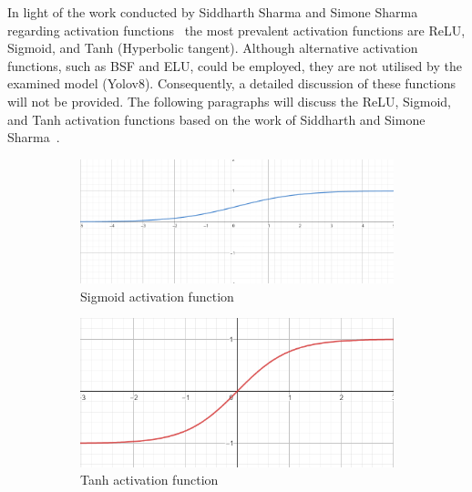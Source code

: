 In light of the work conducted by Siddharth Sharma and Simone Sharma regarding  activation functions~\cite{sharma2017activation}
the most prevalent  activation functions are ReLU, Sigmoid, and Tanh (Hyperbolic tangent).
Although alternative activation functions, such as BSF and ELU, could be employed, they are not utilised by the examined model (Yolov8).
Consequently, a detailed discussion of these functions will not be provided.
The following paragraphs  will discuss the ReLU, Sigmoid, and Tanh activation functions based on the work of Siddharth and Simone Sharma~\cite{sharma2017activation}.


\begin{figure}[h!]
    \centering


    \begin{subfigure}[b]{0.5\textwidth}
        \centering
        \includegraphics[width=\textwidth]{figures/sigmoid}
        \caption{Sigmoid activation function}
        \label{fig:sigmoid}
    \end{subfigure}
    \hfill
    \begin{subfigure}[b]{0.45\textwidth}
        \centering
        \includegraphics[width=\textwidth]{figures/tanh}
        \caption{Tanh activation function}
        \label{fig:tanh}
    \end{subfigure}
    \hfill
    \begin{subfigure}[b]{0.6\textwidth}
        \centering

\end{subfigure}
\end{figure}
